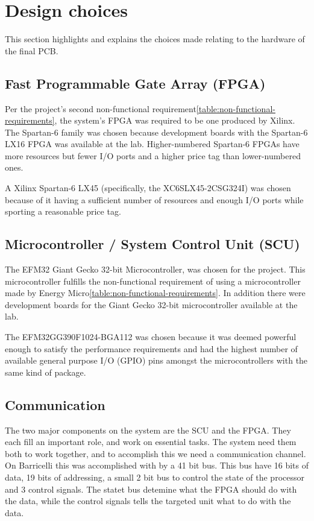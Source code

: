 \section{Design choices} 
This section highlights and explains the choices made relating to the hardware of the final PCB.

\subsection{Fast Programmable Gate Array (FPGA)} \label{pcb:design-choices:ss:fpga}
Per the project's second non-functional requirement\vref{table:non-functional-requirements}, the system's FPGA was required to be one produced by Xilinx.
The Spartan-6 family was chosen because development boards with the Spartan-6 LX16 FPGA was available at the lab.
Higher-numbered Spartan-6 FPGAs have more resources but fewer I/O ports and a higher price tag than lower-numbered ones.

A Xilinx Spartan-6 LX45 (specifically, the XC6SLX45-2CSG324I) was chosen because of it having a sufficient number of resources and enough I/O ports while sporting a reasonable price tag.


\subsection{Microcontroller / System Control Unit (SCU)} \label{pcb:design-choices:ss:scu}
The EFM32 Giant Gecko 32-bit Microcontroller, was chosen for the project.
This microcontroller fulfills the non-functional requirement of using a microcontroller made by Energy Micro\vref{table:non-functional-requirements}.
In addition there were development boards for the Giant Gecko 32-bit microcontroller available at the lab.

The EFM32GG390F1024-BGA112 was chosen because it was deemed powerful enough to satisfy the performance requirements and had the highest number of available general purpose I/O (GPIO) pins amongst the microcontrollers with the same kind of package.


\subsection{Communication} \label{pcb:design-choices:ss:internal_communication}
The two major components on the system are the SCU and the FPGA.
They each fill an important role, and work on essential tasks.
The system need them both to work together, and to accomplish this we need a communication channel.
On Barricelli this was accomplished with by a 41 bit bus.
This bus have 16 bits of data, 19 bits of addressing, a small 2 bit bus to control the state of the processor and 3 control signals.
The statet bus detemine what the FPGA should do with the data, while the control signals tells the targeted unit what to do with the data. 


